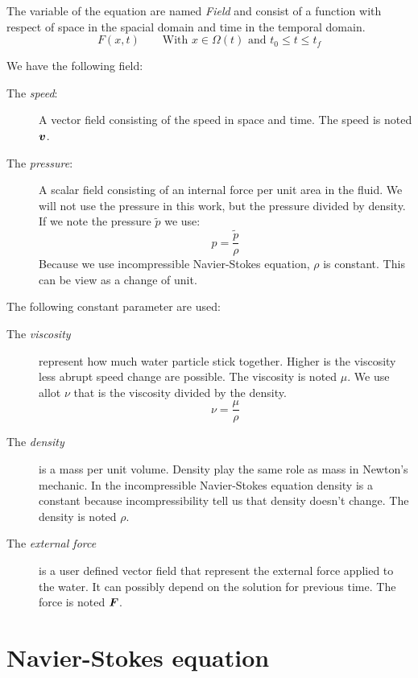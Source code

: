 The variable of the equation are named \emph{Field} and consist of a function with respect of space in the spacial domain and time in the temporal domain.
\begin{equation}
 F(x,t)\qquad \text{With $x\in\Omega(t)$ and $t_0\leq t \leq t_f$}
\end{equation}

We have the following field:
\begin{description}
\item[The \emph{speed}:] A vector field consisting of the speed in space and time.
The speed is noted ${\boldsymbol {v}}$.
\item[The \emph{pressure}:] A scalar field consisting of an internal force per unit area in the fluid.
We will not use the pressure in this work, but the pressure divided by density.
If we note the pressure $\tilde{p}$ we use:
\begin{equation}
 p=\frac{\tilde{p}}{\rho}
\end{equation}
Because we use incompressible Navier-Stokes equation, $\rho$ is constant. This can be view as a change of unit.
\end{description}

The following constant parameter are used:
\begin{description}
\item[The \emph{viscosity}] represent how much water particle stick together.
Higher is the viscosity less abrupt speed change are possible.
The viscosity is noted $\mu$. We use allot $\nu$ that is the viscosity divided by the density.
\begin{equation}
 \nu=\frac{\mu}{\rho}
\end{equation}
\item[The \emph{density}] is a mass per unit volume.
Density play the same role as mass in Newton's mechanic.
In the incompressible Navier-Stokes equation density is a constant because incompressibility tell us that density doesn't change.
The density is noted $\rho$.
\item[The \emph{external force}] is a user defined vector field that represent the external force applied to the water.
It can possibly depend on the solution for previous time.
The force is noted ${\boldsymbol {F}}$.
\end{description}

\section{Navier-Stokes equation}

